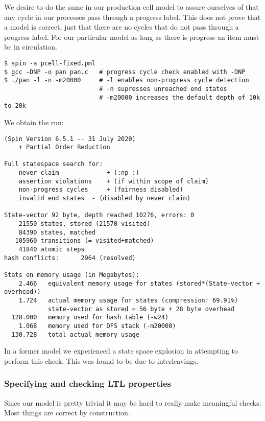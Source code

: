 \documentclass[12pt]{article}
\begin{document}
We desire to do the same in our production cell model to
assure ourselves of that any cycle in our processes pass through a progress label. This does
not prove that a model is correct, just that there are no cycles that do not pass through
a progress label. For our particular model as long as there is progress an item must be
in circulation.
\begin{verbatim}
$ spin -a pcell-fixed.pml
$ gcc -DNP -o pan pan.c   # progress cycle check enabled with -DNP
$ ./pan -l -n -m20000     # -l enables non-progress cycle detection 
                          # -n supresses unreached end states
                          # -m20000 increases the default depth of 10k to 20k
\end{verbatim}
We obtain the run:
\begin{verbatim}
(Spin Version 6.5.1 -- 31 July 2020)
	+ Partial Order Reduction

Full statespace search for:
	never claim         	+ (:np_:)
	assertion violations	+ (if within scope of claim)
	non-progress cycles 	+ (fairness disabled)
	invalid end states	- (disabled by never claim)

State-vector 92 byte, depth reached 10276, errors: 0
    21550 states, stored (21570 visited)
    84390 states, matched
   105960 transitions (= visited+matched)
    41840 atomic steps
hash conflicts:      2964 (resolved)

Stats on memory usage (in Megabytes):
    2.466	equivalent memory usage for states (stored*(State-vector + overhead))
    1.724	actual memory usage for states (compression: 69.91%)
         	state-vector as stored = 56 byte + 28 byte overhead
  128.000	memory used for hash table (-w24)
    1.068	memory used for DFS stack (-m20000)
  130.728	total actual memory usage
\end{verbatim}
In a former model we experienced a state space explosion in attempting to perform
this check. This was found to be due to interleavings.


\subsubsection*{Specifying and checking LTL properties}
Since our model is pretty trivial it may be hard to really make meaningful checks. Most
things are correct by construction.
\end{document}
